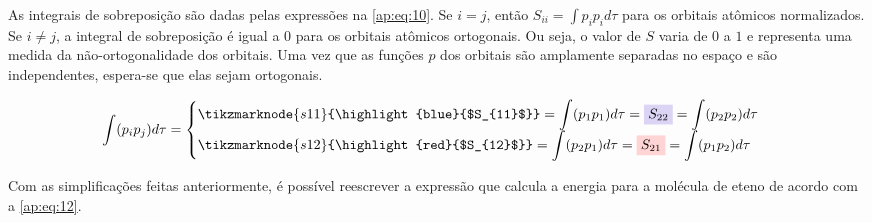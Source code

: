 \newpage

As integrais de sobreposição são dadas pelas expressões na \autoref{ap:eq:10}. Se $i=j$, então $S_{ii} = \displaystyle \int p_i p_i d \tau$ para os orbitais atômicos normalizados. Se $i \neq j $, a integral de sobreposição é igual a $0$ para os orbitais atômicos ortogonais. Ou seja, o valor de $S$ varia de $0$ a $1$ e representa uma medida da não-ortogonalidade dos orbitais. Uma vez que as funções $p$ dos orbitais são amplamente separadas no espaço e são independentes, espera-se que elas sejam ortogonais.

\begin{figure}[htb]
    \vspace{2.3\baselineskip}
\begin{equation}
\label{ap:eq:10}
\displaystyle \int (p_i p_j) d\tau =
\begin{cases}
 \tikzmarknode{s11}{\highlight{blue}{$S_{11}$}} = \displaystyle \int (p_1 p_1) d\tau = \highlight{blue}{$S_{22}$} = \displaystyle \int (p_2 p_2) d\tau \\
 \tikzmarknode{s12}{\highlight{red}{$S_{12}$}} = \displaystyle \int (p_2 p_1) d\tau = \highlight{red}{$S_{21}$} = \displaystyle \int (p_1 p_2) d\tau
\end{cases}
\end{equation}
\end{figure}

Com as simplificações feitas anteriormente, é possível reescrever a expressão que calcula a energia para a molécula de eteno de acordo com a \autoref{ap:eq:12}.

